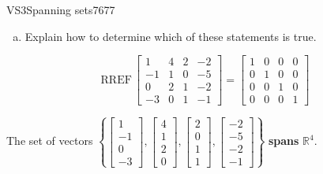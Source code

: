 \begin{exercise}{VS3}{Spanning sets}{7677}
\begin{exerciseStatement}
\begin{enumerate}[(a)]
\begin{itemize}
 
\end{itemize}

     
\item  

 Explain how to determine which of these statements is true. 

 
\end{enumerate}

     \end{exerciseStatement}
 \begin{exerciseAnswer} 

 \[
\mathrm{RREF}\, \left[\begin{array}{cccc}
1 & 4 & 2 & -2 \\
-1 & 1 & 0 & -5 \\
0 & 2 & 1 & -2 \\
-3 & 0 & 1 & -1
\end{array}\right] = \left[\begin{array}{cccc}
1 & 0 & 0 & 0 \\
0 & 1 & 0 & 0 \\
0 & 0 & 1 & 0 \\
0 & 0 & 0 & 1
\end{array}\right]
            \] 

 

 The set of vectors \(\left\{ \left[\begin{array}{c}
1 \\
-1 \\
0 \\
-3
\end{array}\right] , \left[\begin{array}{c}
4 \\
1 \\
2 \\
0
\end{array}\right] , \left[\begin{array}{c}
2 \\
0 \\
1 \\
1
\end{array}\right] , \left[\begin{array}{c}
-2 \\
-5 \\
-2 \\
-1
\end{array}\right] \right\}\) \textbf{spans} \(\mathbb{R}^4\). 

 \end{exerciseAnswer}
 \end{exercise}


